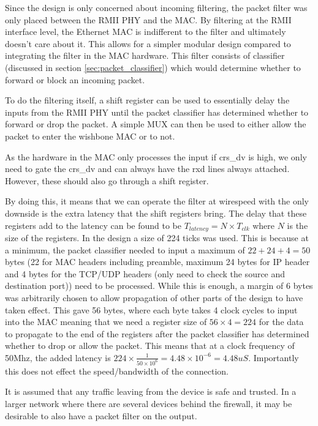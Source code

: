 Since the design is only concerned about incoming filtering, the packet filter was only placed between the RMII PHY and the MAC. By filtering at the RMII interface level, the Ethernet MAC is indifferent to the filter and ultimately doesn't care about it. This allows for a simpler modular design compared to integrating the filter in the MAC hardware. This filter consists of classifier (discussed in section \ref{sec:packet_classifier}) which would determine whether to forward or block an incoming packet.

To do the filtering itself, a shift register can be used to essentially delay the inputs from the RMII PHY until the packet classifier has determined whether to forward or drop the packet. A simple MUX can then be used to either allow the packet to enter the wishbone MAC or to not. 

As the hardware in the MAC only processes the input if crs\_dv is high, we only need to gate the crs\_dv and can always have the rxd lines always attached. However, these should also go through a shift register.

By doing this, it means that we can operate the filter at wirespeed with the only downside is the extra latency that the shift registers bring. The delay that these registers add to the latency can be found to be $T_{latency} = N\times T_{clk}$ where $N$ is the size of the registers. In the design a size of 224 ticks was used. This is because at a minimum, the packet classifier needed to input a maximum of $22 + 24 + 4 = 50$ bytes (22 for MAC headers including preamble, maximum 24 bytes for IP header and 4 bytes for the TCP/UDP headers (only need to check the source and destination port)) need to be processed. While this is enough, a margin of 6 bytes was arbitrarily chosen to allow propagation of other parts of the design to have taken effect. This gave 56 bytes, where each byte takes 4 clock cycles to input into the MAC meaning that we need a register size of $56 \times 4=224$ for the data to propagate to the end of the registers after the packet classifier has determined whether to drop or allow the packet. This means that at a clock frequency of 50Mhz, the added latency is $224 \times \frac{1}{50\times 10^6} = 4.48 \times 10^{-6} = 4.48uS$. Importantly this does not effect the speed/bandwidth of the connection. 


It is assumed that any traffic leaving from the device is safe and trusted. In a larger network where there are several devices behind the firewall, it may be desirable to also have a packet filter on the output. 


